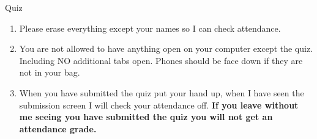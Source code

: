 \documentclass[aspectratio=169]{beamer}
\begin{document}
\begin{frame}{Quiz}
\begin{enumerate}
  \item Please erase everything except your names so I can check attendance.
  \item You are not allowed to have anything open on your computer except the quiz. Including NO additional tabs open. Phones should be face down if they are not in your bag.
  \item When you have submitted the quiz put your hand up, when I have seen the submission screen I will check your attendance off. \textbf{If you leave without me seeing you
  have submitted the quiz you will not get an attendance grade.}
\end{enumerate}
\end{frame}
\end{document}
